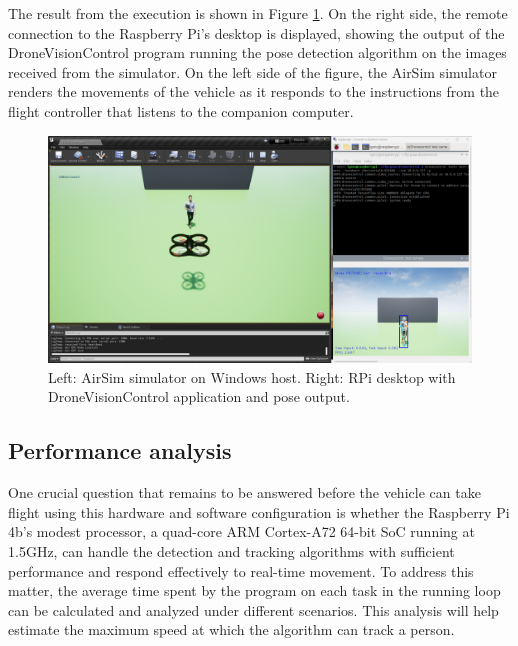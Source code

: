 The result from the execution is shown in Figure \ref{fig:rpi-airsim-test}. On the right side, the remote connection to the Raspberry Pi's desktop is displayed, showing the output of the DroneVisionControl program running the pose detection algorithm on the images received from the simulator. On the left side of the figure, the AirSim simulator renders the movements of the vehicle as it responds to the instructions from the flight controller that listens to the companion computer.

\begin{figure}
  \centering
  \includegraphics[width=\textwidth, keepaspectratio]{img/airsim-rpi-test.png}
  \caption{Left: AirSim simulator on Windows host. Right: RPi desktop with DroneVisionControl application and pose output.}
  \label{fig:rpi-airsim-test}
\end{figure}


\subsection{Performance analysis}
\label{subsec:performance}

One crucial question that remains to be answered before the vehicle can take flight using this hardware and software configuration is whether the Raspberry Pi 4b's modest processor, a quad-core ARM Cortex-A72 64-bit SoC running at 1.5GHz, can handle the detection and tracking algorithms with sufficient performance and respond effectively to real-time movement. To address this matter, the average time spent by the program on each task in the running loop can be calculated and analyzed under different scenarios. This analysis will help estimate the maximum speed at which the algorithm can track a person.



